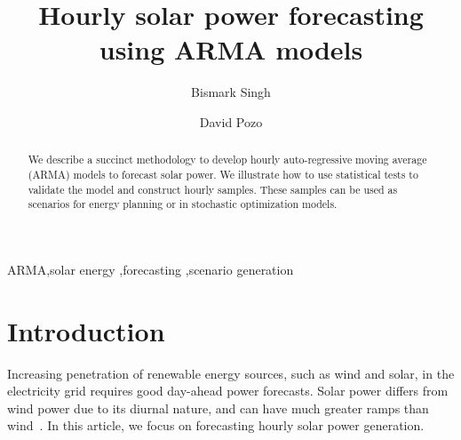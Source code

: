 \documentclass[review]{elsarticle}
\begin{document}
\begin{frontmatter}

\title{Hourly solar power forecasting using ARMA models}

\author{Bismark Singh}
\address{Discrete Mathematics \& Optimization, Sandia National Laboratories 
}


\author{David Pozo}
\address{Center for Energy Systems , Skolkovo Institute of Science and 
Technology}

\begin{abstract}
We describe a succinct methodology to develop hourly auto-regressive moving 
average (ARMA) models to forecast solar power. We illustrate how to use 
statistical tests to validate the model and construct hourly samples. These 
samples can be used as scenarios for energy planning or in stochastic 
optimization models.
\end{abstract}

\begin{keyword}
ARMA\sep solar energy \sep forecasting \sep scenario generation
\end{keyword}

\end{frontmatter}

\linenumbers

\section{Introduction}
Increasing penetration of renewable energy sources, such as wind and solar, in 
the electricity grid requires good day-ahead power forecasts. Solar power 
differs from wind power due to its diurnal nature, and can have much greater 
ramps than wind~\cite{graabak2016variability}. In this article, we focus 
on forecasting  hourly solar power generation. 
\end{document}
